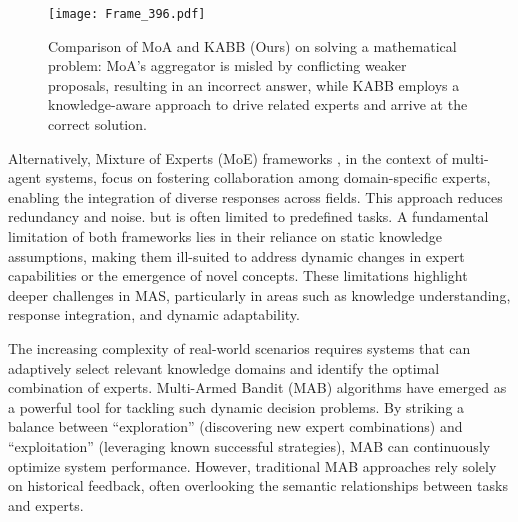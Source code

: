 \begin{figure}[h]
\vskip 0.2in
\begin{center}
\centerline{\texttt{[image: Frame\_396.pdf]}}
\caption{Comparison of MoA and KABB (Ours) on solving a mathematical problem: MoA's aggregator is misled by conflicting weaker proposals, resulting in an incorrect answer, while KABB employs a knowledge-aware approach to drive related experts and arrive at the correct solution.}
\label{fig:math}
\end{center}
\vskip -0.2in
\end{figure}



Alternatively, Mixture of Experts (MoE) frameworks \cite{gong2024large,zhang2024optimizing,wang2023fusing,tang2023medagents}, in the context of multi-agent systems, focus on fostering collaboration among domain-specific experts, enabling the integration of diverse responses across fields. This approach reduces redundancy and noise. but is often limited to predefined tasks. A fundamental limitation of both frameworks lies in their reliance on static knowledge assumptions, making them ill-suited to address dynamic changes in expert capabilities or the emergence of novel concepts. These limitations highlight deeper challenges in MAS, particularly in areas such as knowledge understanding, response integration, and dynamic adaptability.

The increasing complexity of real-world scenarios requires systems that can adaptively select relevant knowledge domains and identify the optimal combination of experts. Multi-Armed Bandit (MAB) algorithms \cite{mahajan2008multi} have emerged as a powerful tool for tackling such dynamic decision problems. By striking a balance between ``exploration'' (discovering new expert combinations) and ``exploitation'' (leveraging known successful strategies), MAB can continuously optimize system performance. However, traditional MAB approaches rely solely on historical feedback, often overlooking the semantic relationships between tasks and experts.

